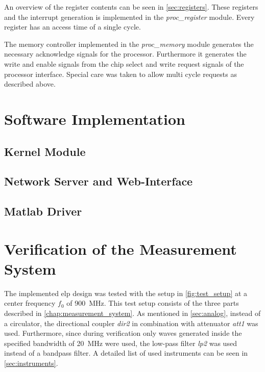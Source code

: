 \documentclass[12pt,a4paper,parskip=full,abstract=true,BCOR=12mm,twoside,open=right]{scrreprt}
\def\device#1{\textit{#1}}
\begin{document}
An overview of the register contents can be seen in \cref{sec:registers}. These
registers and the interrupt generation is implemented in the \device{proc\_register}
module. Every register has an access time of a single cycle.

The memory controller implemented in the \device{proc\_memory} module generates
the necessary acknowledge signals for the processor. Furthermore it generates the
write and enable signals from the chip select and write request signals of the
processor interface. Special care was taken to allow multi cycle requests as
described above.



\chapter{Software Implementation}
\label{chap:software}
\section{Kernel Module}
\label{sec:kernel_module}
\section{Network Server and Web-Interface}
\section{Matlab Driver}
\label{sec:matlab}



\chapter{Verification of the Measurement System}
\label{chap:verification}

The implemented \gls{elp} design was tested with the setup in
\cref{fig:test_setup} at a center frequency $f_0$ of \SI{900}{\mega\hertz}. This test setup consists of the three parts
described in \cref{chap:measurement_system}. As mentioned in
\cref{sec:analog}, instead of a circulator, the directional coupler
\device{dir2} in combination with attenuator \device{att1} was used.
Furthermore, since during verification only waves generated inside
the specified bandwidth of \SI{20}{\mega\hertz} were used, the low-pass filter \device{lp2}
was used instead of a bandpass filter. A detailed list of used
instruments can be seen in \cref{sec:instruments}.
\end{document}
